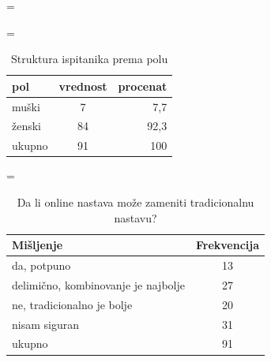 \documentclass[11pt]{beamer}
\begin{document}
\parskip=\baselineskip
\begin{table}
\centering
\parskip=\baselineskip
  \begin{tabular}{ | l | c | r |}
    \hline
    \textbf{pol} & \textbf{vrednost} & \textbf{procenat} \\ \hline
    muški & 7 & 7,7 \\ \hline 
    ženski & 84 & 92,3 \\ \hline
    ukupno & 91 & 100 \\
    \hline
  \end{tabular}
  \caption{Struktura ispitanika prema polu}
\end{table}

\begin{table}
\parskip=\baselineskip
\centering
  \begin{tabular}{ | l | c |}
    \hline
    \textbf{Mišljenje} & \textbf{Frekvencija} \\ \hline
    da, potpuno & 13  \\ \hline 
    delimično, kombinovanje je najbolje & 27  \\ \hline
    ne, tradicionalno je bolje & 20  \\ \hline
    nisam siguran & 31 \\ \hline
    ukupno &  91 \\
    \hline
  \end{tabular}
  \caption{Da li online nastava može zameniti tradicionalnu nastavu?}
\end{table}
\end{document}
